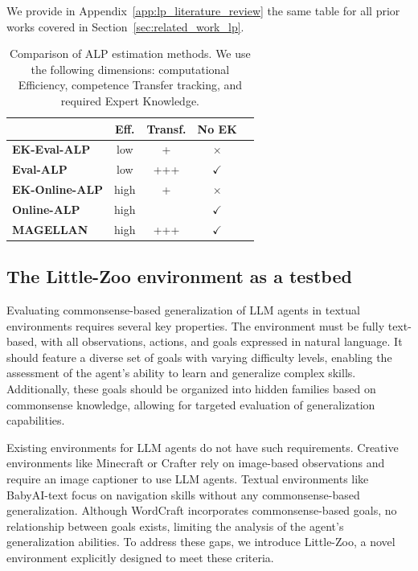\documentclass{article}
\begin{document}
We provide in Appendix~\ref{app:lp_literature_review} the same table for all prior works covered in Section~\ref{sec:related_work_lp}.


\begin{table}[h!] 
\centering 
\small
\begin{tabular}{lcccc}
\toprule
& \textbf{Eff.} & \textbf{Transf.} & \textbf{No EK} \\ 
\midrule 
\textbf{EK-Eval-ALP} & low & + & $\times$ \\ 
\textbf{Eval-ALP} & low & +++ & $\checkmark$ \\ 
\textbf{EK-Online-ALP} & high & + & $\times$ \\ 
\textbf{Online-ALP} & high & & $\checkmark$ \\ 
\textbf{MAGELLAN} & high & +++ & $\checkmark$ \\ 
\bottomrule
\end{tabular}
\caption{Comparison of ALP estimation methods. We use the following dimensions: computational Efficiency, competence Transfer tracking, and required Expert Knowledge.} 
\label{tab:table_competence}
\end{table}

\subsection{The Little-Zoo environment as a testbed} \label{sec:zoo_env}
Evaluating commonsense-based generalization of LLM agents in textual environments requires several key properties. The environment must be fully text-based, with all observations, actions, and goals expressed in natural language. It should feature a diverse set of goals with varying difficulty levels, enabling the assessment of the agent's ability to learn and generalize complex skills. Additionally, these goals should be organized into hidden families based on commonsense knowledge, allowing for targeted evaluation of generalization capabilities.

Existing environments for LLM agents do not have such requirements. Creative environments like Minecraft \citep{johnson2016malmo} or Crafter \citep{hafner2021benchmarking} rely on image-based observations and require an image captioner to use LLM agents. Textual environments like BabyAI-text \citep{carta_grounding_2023} focus on navigation skills without any commonsense-based generalization. Although WordCraft \citep{jiang2020wordcraft} incorporates commonsense-based goals, no relationship between goals exists, limiting the analysis of the agent's generalization abilities. To address these gaps, we introduce Little-Zoo, a novel environment explicitly designed to meet these criteria.
\end{document}
